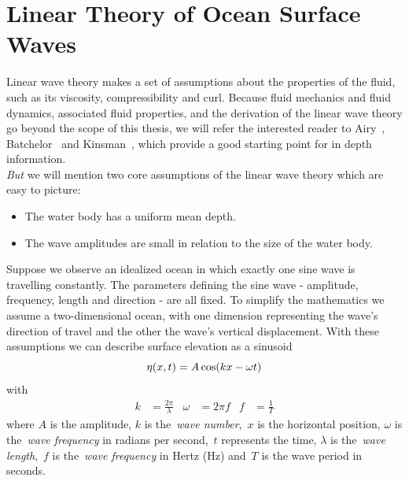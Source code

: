 \section{Linear Theory of Ocean Surface Waves}
\label{sec:linear_theory_ocean_waves}
Linear wave theory makes a set of assumptions about the properties of the fluid, such as its viscosity,
compressibility and curl. Because fluid mechanics and fluid dynamics, associated fluid properties, and the derivation
of the linear wave theory go beyond the scope of this thesis, we will refer the interested reader
to Airy~\cite{book:airy1845tides}, Batchelor~\cite{book:batchelor2000introduction}
and Kinsman~\cite{book:kinsman2002wind}, which provide a good starting point for in depth information.\\

\emph{But} we will mention two core assumptions of the linear wave theory which are easy to picture:
\begin{itemize}
 \item The water body has a uniform mean depth.
 \item The wave amplitudes are small in relation to the size of the water body.
\end{itemize}
Suppose we observe an idealized ocean in which exactly one sine wave is travelling constantly.
The parameters defining the sine wave - amplitude, frequency, length and direction - are all fixed.
To simplify the mathematics we assume a two-dimensional ocean, with one
dimension representing the wave's direction of travel and the  other the wave's
vertical displacement. With these assumptions we can describe surface elevation
as a sinusoid
%
\begin{equation}
\label{eq:sinusoid}
 \eta(x, t) = A\cos(kx - \omega t)\\
\end{equation}
with
\begin{align}
 k &= \frac{2\pi}{\lambda} & \omega &= 2\pi f & f &= \frac{1}{T}
\end{align}
%
where $A$ is the amplitude, $k$ is the~\emph{wave number},~$x$ is the horizontal position,
$\omega$ is the~\emph{wave frequency} in radians per second,~$t$ represents the time,
$\lambda$ is the~\emph{wave length},~$f$ is the~\emph{wave frequency} in Hertz (Hz) and~$T$
is the wave period in seconds.\\


